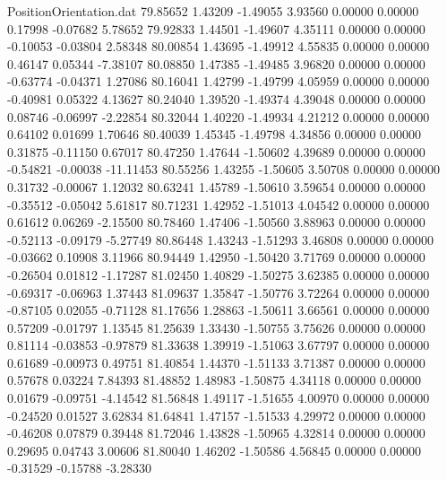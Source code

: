 \begin{filecontents}{PositionOrientation.dat}
  79.85652    1.43209   -1.49055     3.93560    0.00000    0.00000    0.17998   -0.07682    5.78652
  79.92833    1.44501   -1.49607     4.35111    0.00000    0.00000   -0.10053   -0.03804    2.58348
  80.00854    1.43695   -1.49912     4.55835    0.00000    0.00000    0.46147    0.05344   -7.38107
  80.08850    1.47385   -1.49485     3.96820    0.00000    0.00000   -0.63774   -0.04371    1.27086
  80.16041    1.42799   -1.49799     4.05959    0.00000    0.00000   -0.40981    0.05322    4.13627
  80.24040    1.39520   -1.49374     4.39048    0.00000    0.00000    0.08746   -0.06997   -2.22854
  80.32044    1.40220   -1.49934     4.21212    0.00000    0.00000    0.64102    0.01699    1.70646
  80.40039    1.45345   -1.49798     4.34856    0.00000    0.00000    0.31875   -0.11150    0.67017
  80.47250    1.47644   -1.50602     4.39689    0.00000    0.00000   -0.54821   -0.00038  -11.11453
  80.55256    1.43255   -1.50605     3.50708    0.00000    0.00000    0.31732   -0.00067    1.12032
  80.63241    1.45789   -1.50610     3.59654    0.00000    0.00000   -0.35512   -0.05042    5.61817
  80.71231    1.42952   -1.51013     4.04542    0.00000    0.00000    0.61612    0.06269   -2.15500
  80.78460    1.47406   -1.50560     3.88963    0.00000    0.00000   -0.52113   -0.09179   -5.27749
  80.86448    1.43243   -1.51293     3.46808    0.00000    0.00000   -0.03662    0.10908    3.11966
  80.94449    1.42950   -1.50420     3.71769    0.00000    0.00000   -0.26504    0.01812   -1.17287
  81.02450    1.40829   -1.50275     3.62385    0.00000    0.00000   -0.69317   -0.06963    1.37443
  81.09637    1.35847   -1.50776     3.72264    0.00000    0.00000   -0.87105    0.02055   -0.71128
  81.17656    1.28863   -1.50611     3.66561    0.00000    0.00000    0.57209   -0.01797    1.13545
  81.25639    1.33430   -1.50755     3.75626    0.00000    0.00000    0.81114   -0.03853   -0.97879
  81.33638    1.39919   -1.51063     3.67797    0.00000    0.00000    0.61689   -0.00973    0.49751
  81.40854    1.44370   -1.51133     3.71387    0.00000    0.00000    0.57678    0.03224    7.84393
  81.48852    1.48983   -1.50875     4.34118    0.00000    0.00000    0.01679   -0.09751   -4.14542
  81.56848    1.49117   -1.51655     4.00970    0.00000    0.00000   -0.24520    0.01527    3.62834
  81.64841    1.47157   -1.51533     4.29972    0.00000    0.00000   -0.46208    0.07879    0.39448
  81.72046    1.43828   -1.50965     4.32814    0.00000    0.00000    0.29695    0.04743    3.00606
  81.80040    1.46202   -1.50586     4.56845    0.00000    0.00000   -0.31529   -0.15788   -3.28330

\end{filecontents}

